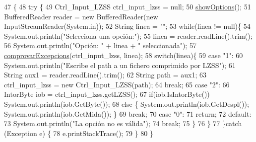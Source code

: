\begin{DoxyCode}
47                                            \{
48     \textcolor{keywordflow}{try} \{
49         Ctrl\_Input\_LZSS ctrl\_input\_lzss = null;
50         \hyperlink{classpersistencia_1_1input_1_1Driver____Ctrl__Input__LZSS_a8221302c3603529654a83e02b976c662}{showOptions}();
51         BufferedReader reader = \textcolor{keyword}{new} BufferedReader(\textcolor{keyword}{new} InputStreamReader(System.in));
52         String linea = \textcolor{stringliteral}{""};
53         \textcolor{keywordflow}{while}(linea != null)\{
54             System.out.println(\textcolor{stringliteral}{"Selecciona una opción:"});
55             linea = reader.readLine().trim();
56             System.out.println(\textcolor{stringliteral}{"Opción: "} + linea + \textcolor{stringliteral}{" seleccionada"});
57             \hyperlink{classpersistencia_1_1input_1_1Driver____Ctrl__Input__LZSS_a221f978664fc97bdab3b18d3c5f55155}{comprovarExcepcions}(ctrl\_input\_lzss, linea);
58             \textcolor{keywordflow}{switch}(linea)\{
59                 \textcolor{keywordflow}{case} \textcolor{stringliteral}{"1"}:
60                     System.out.println(\textcolor{stringliteral}{"Escribe el path a un fichero comprimido por LZSS"});
61                     String aux1 = reader.readLine().trim();
62                     String path = aux1;
63                     ctrl\_input\_lzss = \textcolor{keyword}{new} Ctrl\_Input\_LZSS(path);
64                 \textcolor{keywordflow}{break};
65                 \textcolor{keywordflow}{case} \textcolor{stringliteral}{"2"}:
66                     IntorByte iob =  ctrl\_input\_lzss.getLZSS();
67                     \textcolor{keywordflow}{if}(iob.IsIntorByte()) System.out.println(iob.GetByte());
68                     \textcolor{keywordflow}{else} \{ System.out.println(iob.GetDespl()); System.out.println(iob.GetMida()); \}
69                 \textcolor{keywordflow}{break};
70                 \textcolor{keywordflow}{case} \textcolor{stringliteral}{"0"}:
71                     \textcolor{keywordflow}{return};
72                 \textcolor{keywordflow}{default}:
73                     System.out.println(\textcolor{stringliteral}{"La opción no es válida"});
74                 \textcolor{keywordflow}{break};
75             \}
76         \}
77     \}\textcolor{keywordflow}{catch} (Exception e) \{
78         e.printStackTrace();
79     \}
80     \}
\end{DoxyCode}
\mbox{\label{classpersistencia_1_1input_1_1Driver____Ctrl__Input__LZSS_a8221302c3603529654a83e02b976c662}} 
